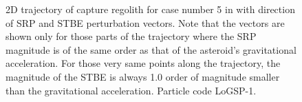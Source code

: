 \begin{figure}[htb]
\caption{2D trajectory of capture regolith for case number 5 in  with direction of \gls{SRP} and \gls{STBE} perturbation vectors. Note that the vectors are shown only for those parts of the trajectory where the \gls{SRP} magnitude is of the same order as that of the asteroid's gravitational acceleration. For those very same points along the trajectory, the magnitude of the \gls{STBE} is always 1.0 order of magnitude smaller than the gravitational acceleration. Particle code LoGSP-1.}
\label{fig:LoGSP_1_capture_case_5_2d_trajectory_srp_stbe_perturbationVectors}
\end{figure}
\FloatBarrier

